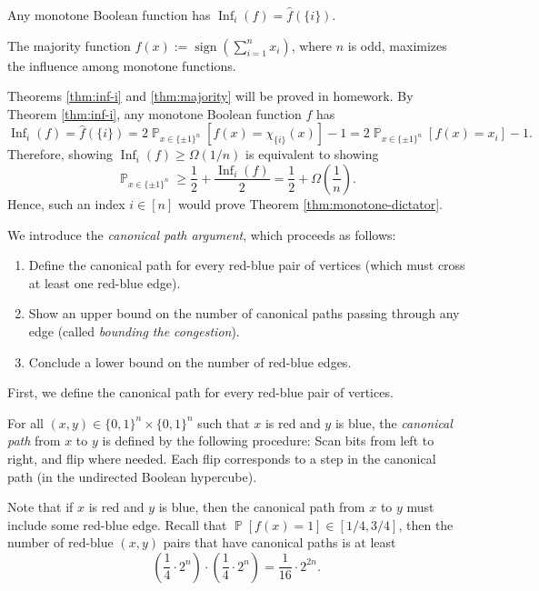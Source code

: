 \documentclass[letterpaper, reqno,11pt]{article}
\newcommand{\PP}{\mathop{{}\mathbb{P}}}
\DeclareMathOperator{\sign}{sign}
\DeclareMathOperator{\Inf}{Inf}
\begin{document}
\begin{theorem} \label{thm:inf-i}
  Any monotone Boolean function has $\Inf_i(f) = \hat{f}(\{ i \})$.
\end{theorem}

\begin{theorem} \label{thm:majority}
  The majority function $f(x) := \sign(\sum_{i = 1}^n x_i)$, where $n$ is odd, maximizes the influence among monotone functions.
\end{theorem}

Theorems \ref{thm:inf-i} and \ref{thm:majority} will be proved in homework. By Theorem \ref{thm:inf-i}, any monotone Boolean function $f$ has
$$ \Inf_i(f) = \hat{f}(\{ i \}) = 2\PP_{x \in \{ \pm 1 \}^n}\left[f(x) = \chi_{\{ i \}}(x)\right] - 1 = 2\PP_{x \in \{ \pm 1 \}^n}\left[f(x) = x_i\right] - 1. $$
Therefore, showing $\Inf_i(f) \geq \Omega(1/n)$ is equivalent to showing
$$ \PP_{x \in \{ \pm 1 \}^n} \geq \frac{1}{2} + \frac{\Inf_i(f)}{2} = \frac{1}{2} + \Omega\left(\frac{1}{n}\right). $$
Hence, such an index $i \in [n]$ would prove Theorem \ref{thm:monotone-dictator}.

We introduce the \emph{canonical path argument}, which proceeds as follows:
\begin{enumerate}[label=(\roman*), itemsep=0pt]
  \item Define the canonical path for every red-blue pair of vertices (which must cross at least one red-blue edge).
  \item Show an upper bound on the number of canonical paths passing through any edge (called \emph{bounding the congestion}).
  \item Conclude a lower bound on the number of red-blue edges.
\end{enumerate}

First, we define the canonical path for every red-blue pair of vertices.

\begin{definition}
  For all $(x, y) \in \{ 0, 1 \}^n \times \{ 0, 1 \}^n$ such that $x$ is red and $y$ is blue, the \emph{canonical path} from $x$ to $y$ is defined by the following procedure: Scan bits from left to right, and flip where needed. Each flip corresponds to a step in the canonical path (in the undirected Boolean hypercube).
\end{definition}

Note that if $x$ is red and $y$ is blue, then the canonical path from $x$ to $y$ must include some red-blue edge. Recall that $\PP[f(x) = 1] \in [1/4, 3/4]$, then the number of red-blue $(x, y)$ pairs that have canonical paths is at least
$$ \left(\frac{1}{4} \cdot 2^n\right) \cdot \left(\frac{1}{4} \cdot 2^n\right) = \frac{1}{16} \cdot 2^{2n}. $$
\end{document}
